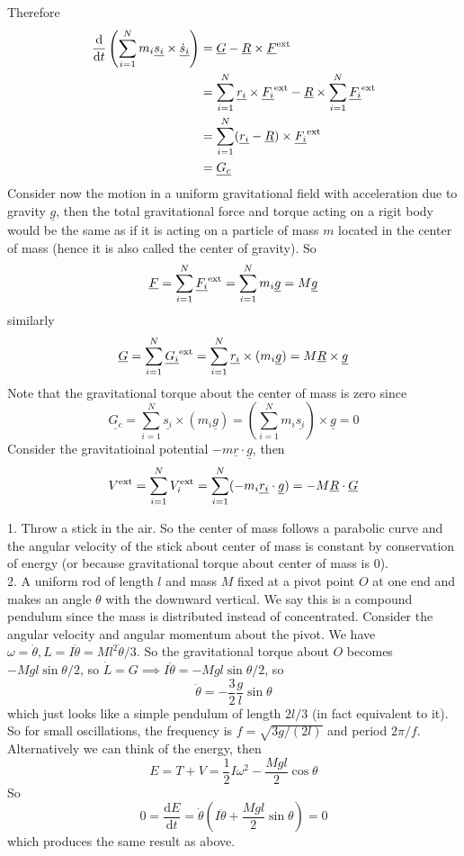 Therefore
\begin{align*}
    \frac{\mathrm d}{\mathrm dt}\left( \sum_{i=1}^Nm_i\underline{s_i}\times\underline{\dot{s}_i} \right)&=\underline{G}-\underline{R}\times\underline{F}^{\rm ext}\\
    &=\sum_{i=1}^N\underline{r_i}\times\underline{F_i}^{\rm ext}-\underline{R}\times\sum_{i=1}^N\underline{F_i}^{\rm ext}\\
    &=\sum_{i=1}^N(\underline{r_i}-\underline{R})\times\underline{F_i}^{\rm ext}\\
    &=\underline{G_c}
\end{align*}
Consider now the motion in a uniform gravitational field with acceleration due to gravity $\underline{g}$, then the total gravitational force and torque acting on a rigit body would be the same as if it is acting on a particle of mass $m$ located in the center of mass (hence it is also called the center of gravity).
So
$$\underline{F}=\sum_{i=1}^N\underline{F_i}^{\rm ext}=\sum_{i=1}^Nm_i\underline{g}=M\underline{g}$$
similarly
$$\underline{G}=\sum_{i=1}^N\underline{G_i}^{\rm ext}=\sum_{i=1}^N\underline{r_i}\times(m_i\underline{g})=M\underline{R}\times\underline{g}$$
Note that the gravitational torque about the center of mass is zero since
$$\underline{G_c}=\sum_{i=1}^N\underline{s_i}\times(m_i\underline{g})=\left( \sum_{i=1}^Nm_i\underline{s_i} \right)\times\underline{g}=0$$
Consider the gravitatioinal potential $-m\underline{r}\cdot\underline{g}$, then
$$V^{\rm ext}=\sum_{i=1}^NV_i^{\rm ext}=\sum_{i=1}^N(-m_i\underline{r_i}\cdot\underline{g})=-M\underline{R}\cdot\underline{G}$$
\begin{example}
    1. Throw a stick in the air.
    So the center of mass follows a parabolic curve and the angular velocity of the stick about center of mass is constant by conservation of energy (or because gravitational torque about center of mass is $0$).\\
    2. A uniform rod of length $l$ and mass $M$ fixed at a pivot point $O$ at one end and makes an angle $\theta$ with the downward vertical.
    We say this is a compound pendulum since the mass is distributed instead of concentrated.
    Consider the angular velocity and angular momentum about the pivot.
    We have $\omega=\dot\theta,L=I\dot\theta=Ml^2\dot\theta/3$.
    So the gravitational torque about $O$ becomes $-Mgl\sin\theta/2$, so $\dot{L}=G\implies I\ddot\theta=-Mgl\sin\theta/2$, so
    $$\ddot\theta=-\frac{3}{2}\frac{g}{l}\sin\theta$$
    which just looks like a simple pendulum of length $2l/3$ (in fact equivalent to it).
    So for small oscillations, the frequency is $f=\sqrt{3g/(2l)}$ and period $2\pi/f$.\\
    Alternatively we can think of the energy, then
    $$E=T+V=\frac{1}{2}I\omega^2-\frac{Mgl}{2}\cos\theta$$
    So
    $$0=\frac{\mathrm dE}{\mathrm dt}=\dot\theta\left(I\ddot\theta+\frac{Mgl}{2}\sin\theta\right)=0$$
    which produces the same result as above.
\end{example}
